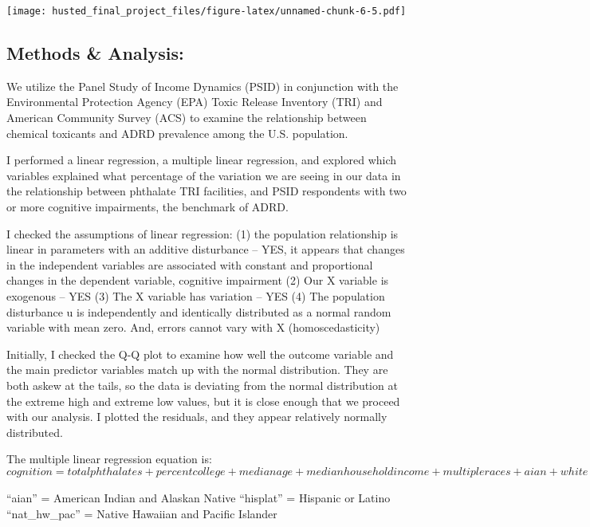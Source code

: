 \documentclass[
]{article}
\newenvironment{Shaded}{\begin{snugshade}}{\end{snugshade}}
\newcommand{\DocumentationTok}[1]{\textcolor[rgb]{0.56,0.35,0.01}{\textbf{\textit{#1}}}}
\newcommand{\FunctionTok}[1]{\textcolor[rgb]{0.13,0.29,0.53}{\textbf{#1}}}
\newcommand{\NormalTok}[1]{#1}
\newcommand{\SpecialCharTok}[1]{\textcolor[rgb]{0.81,0.36,0.00}{\textbf{#1}}}
\begin{document}
\texttt{[image: husted\_final\_project\_files/figure-latex/unnamed-chunk-6-5.pdf]}

\hypertarget{methods-analysis}{%
\subsection{Methods \& Analysis:}\label{methods-analysis}}

We utilize the Panel Study of Income Dynamics (PSID) in conjunction with
the Environmental Protection Agency (EPA) Toxic Release Inventory (TRI)
and American Community Survey (ACS) to examine the relationship between
chemical toxicants and ADRD prevalence among the U.S. population.

I performed a linear regression, a multiple linear regression, and
explored which variables explained what percentage of the variation we
are seeing in our data in the relationship between phthalate TRI
facilities, and PSID respondents with two or more cognitive impairments,
the benchmark of ADRD.

I checked the assumptions of linear regression: (1) the population
relationship is linear in parameters with an additive disturbance --
YES, it appears that changes in the independent variables are associated
with constant and proportional changes in the dependent variable,
cognitive impairment (2) Our X variable is exogenous -- YES (3) The X
variable has variation -- YES (4) The population disturbance u is
independently and identically distributed as a normal random variable
with mean zero. And, errors cannot vary with X (homoscedasticity)

Initially, I checked the Q-Q plot to examine how well the outcome
variable and the main predictor variables match up with the normal
distribution. They are both askew at the tails, so the data is deviating
from the normal distribution at the extreme high and extreme low values,
but it is close enough that we proceed with our analysis. I plotted the
residuals, and they appear relatively normally distributed.

The multiple linear regression equation is:
\(cognition = total phthalates + percent college + median age + median household income + multiple races + aian + white + hisplat + black + other + asian + nat_hw_pac\)

``aian'' = American Indian and Alaskan Native ``hisplat'' = Hispanic or
Latino ``nat\_hw\_pac'' = Native Hawaiian and Pacific Islander

\begin{Shaded}
\end{Shaded}
\end{document}
